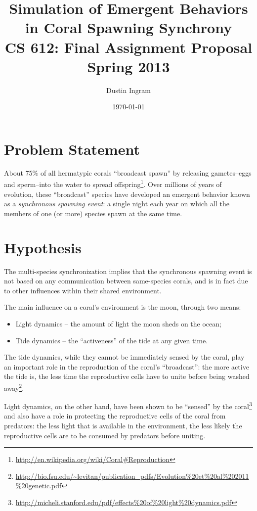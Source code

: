 \documentclass{article}
\title{\textbf{Simulation of Emergent Behaviors in Coral Spawning Synchrony} \\
CS 612: Final Assignment Proposal \\Spring 2013 }
\author{Dustin Ingram}
\date{\today}
\begin{document}
\maketitle

\section{Problem Statement}
About 75\% of all hermatypic corals ``broadcast spawn'' by releasing
gametes--eggs and sperm--into the water to spread
offspring\footnote{\url{http://en.wikipedia.org/wiki/Coral#Reproduction}}. Over
millions of years of evolution, these ``broadcast'' species have developed an
emergent behavior known as a \emph{synchronous spawning event}: a single night
each year on which all the members of one (or more) species spawn at the same
time.

\section{Hypothesis}
The multi-species synchronization implies that the synchronous spawning event is
not based on any communication between same-species corals, and is in fact due
to other influences within their shared environment.

The main influence on a coral's environment is the moon, through two means:
\begin{itemize}
    \item Light dynamics -- the amount of light the moon sheds on the ocean;
    \item Tide dynamics -- the ``activeness'' of the tide at any given time.
\end{itemize}

The tide dynamics, while they cannot be immediately sensed by the coral, play an
important role in the reproduction of the coral's ``broadcast'': the more active
the tide is, the less time the reproductive cells have to unite before being
washed
away\footnote{\url{http://bio.fsu.edu/~levitan/publication_pdfs/Evolution\%20et\%20al\%202011\%20genetic.pdf}}.

Light dynamics, on the other hand, have been shown to be ``sensed'' by the
coral\footnote{\url{http://micheli.stanford.edu/pdf/effects\%20of\%20light\%20dynamics.pdf}}
and also have a role in protecting the reproductive cells of the coral from
predators: the less light that is available in the environment, the less likely
the reproductive cells are to be consumed by predators before uniting.
\end{document}
